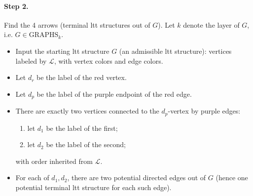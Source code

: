 \documentclass[11pt]{article}
\theoremstyle{definition}
\begin{document}
\paragraph{Step 2.}
Find the 4 arrows (terminal ltt structures out of $G$).
Let $k$ denote the layer of $G$, i.e. $G\in\mathrm{GRAPHS}_k$.
\begin{itemize}
  \item Input the starting ltt structure $G$ (an admissible ltt structure):
        vertices labeled by $\mathcal{L}$, with vertex colors and edge colors.
  \item Let $d_r$ be the label of the red vertex.
  \item Let $d_p$ be the label of the purple endpoint of the red edge.
  \item There are exactly two vertices connected to the $d_p$-vertex by purple edges:
        \begin{enumerate}[label=\arabic*)]
          \item let $d_1$ be the label of the first;
          \item let $d_2$ be the label of the second;
        \end{enumerate}
        with order inherited from $\mathcal{L}$.
  \item For each of $d_1,d_2$, there are two potential directed edges out of $G$
        (hence one potential terminal ltt structure for each such edge).
\end{itemize}
\end{document}

